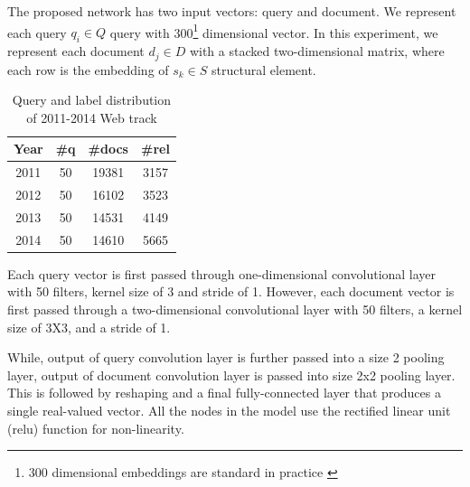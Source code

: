 \documentclass[runningheads,a4paper]{llncs}
\begin{document}
The proposed network has two input vectors: query and document. We represent each 
query $q_i \in \mathit{Q}$ query with 300\footnote{300 dimensional 
embeddings are standard in practice 
\cite{mitra2015query,zamani2016estimating}} dimensional vector. 
In this experiment, we represent each document $d_j \in \mathit{D}$  
with a stacked two-dimensional matrix, where each row is the embedding 
of $s_k \in \mathit{S}$ structural element. 
\begin{table}
  \centering
 \caption{Query and label distribution of 2011-2014 Web track}
 \label{table:data_distribution} 
 \begin{tabular}{|c|c|c|c|}
\hline
Year	&	\#q	&	\#docs	&	\#rel	 \\ \hline
2011	&	50	&	19381	&	3157		\\ \hline
2012	&	50	&	16102	&	3523		\\ \hline
2013	&	50	&	14531	&	4149		\\ \hline
2014	&	50	&	14610	&	5665		\\ \hline
 \end{tabular}
\end{table}

Each query vector is first passed through one-dimensional convolutional
layer with 50 filters, kernel size of 3 and stride of 1. 
However, each document vector is first passed through a two-dimensional convolutional
layer with 50 filters, a kernel size of 3X3, and a stride of 1. 

While, output of query convolution layer is further passed into a size 2 pooling 
layer, output of document convolution layer is passed into size 2x2 pooling layer.  
This is followed by reshaping and a final fully-connected layer 
that produces a single real-valued vector. 
All the nodes in the model use the rectified linear unit (relu) function 
for non-linearity.
\end{document}

